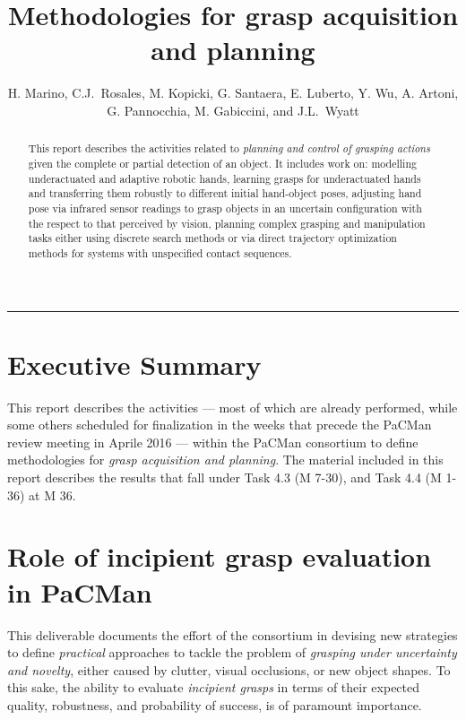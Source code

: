 \documentclass[a4paper,11pt,pdf]{pacmanreport}
\title{Methodologies for grasp acquisition and planning}
\author{H. Marino, C.J.~Rosales, M. Kopicki, G. Santaera, E. Luberto, Y. Wu, A. Artoni, G. Pannocchia, M. Gabiccini, and J.L.~Wyatt}
\begin{document}
\maketitle

\begin{abstract}
\noindent This report describes the activities related to \emph{planning and  control of grasping actions} given the complete or partial detection of an object. It includes work on: modelling underactuated and adaptive robotic hands, learning grasps for underactuated hands and transferring them robustly to different initial hand-object poses, adjusting hand pose via infrared sensor readings to grasp objects in an uncertain configuration with the respect to that perceived by vision, planning complex grasping and manipulation tasks either using discrete search methods or via direct trajectory optimization methods for systems with unspecified contact sequences.
\end{abstract}


\vspace{.2em}
\hrule

\footnotesize

\tableofcontents

\normalsize

\newpage

\section*{Executive Summary}

This report describes the activities --- most of which are already performed, while some others scheduled for finalization in the weeks that precede the PaCMan review meeting in Aprile 2016 --- within the PaCMan consortium to define methodologies for \emph{grasp acquisition and planning}. The material included in this report describes the results that fall under Task 4.3 (M 7-30), and Task 4.4 (M 1-36) at M 36.

\section*{Role of incipient grasp evaluation in PaCMan}

This deliverable documents the effort of the consortium in devising new strategies to define \emph{practical} approaches to tackle the problem of \emph{grasping under uncertainty and novelty}, either caused by clutter, visual occlusions, or new object shapes. To this sake, the ability to evaluate \emph{incipient grasps} in terms of their expected quality, robustness, and probability of success, is of paramount importance.
\end{document}
